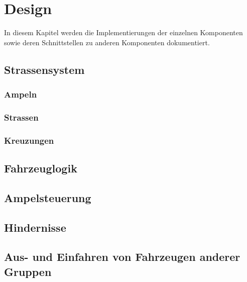 
\chapter{Design}
\label{Design}

In diesem Kapitel werden die Implementierungen der einzelnen Komponenten sowie deren Schnittstellen zu anderen Komponenten dokumentiert.

\thispagestyle{standard}
\pagestyle{standard}

\section{Strassensystem}
\label{Strassensystem}

\subsection{Ampeln}

\subsection{Strassen}

\subsection{Kreuzungen}

\section{Fahrzeuglogik}
\label{Fahrzeuglogik}

\section{Ampelsteuerung}

\section{Hindernisse}
\label{Hindernisse}

\section{Aus- und Einfahren von Fahrzeugen anderer Gruppen}